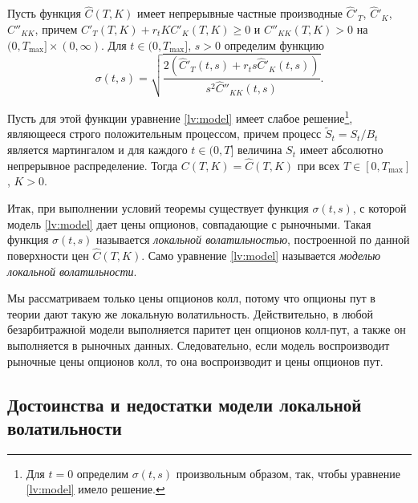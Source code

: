 \begin{theorem}
\label{lv:t:dupire}
Пусть функция $\hat C(T,K)$ имеет непрерывные частные производные $\hat C'_T$, $\hat C'_K$, $\hat C''_{KK}$, причем $C'_T(T,K) + r_t K C'_K(T,K)\ge 0$ и $C''_{KK}(T,K)>0$  на $(0,T_{\max}]\times(0,\infty)$.
Для $t\in(0,T_{\max}]$, $s>0$ определим функцию
\begin{equation}
\label{lv:dupire}
\sigma(t,s) = \sqrt{\frac{2(\hat C'_T(t,s) + r_ts\hat C'_K(t,s))}{s^2\hat C''_{KK}(t,s)}}.
\end{equation}

Пусть для этой функции уравнение \eqref{lv:model} имеет слабое решение\footnote{Для $t=0$ определим $\sigma(t,s)$ произвольным образом, так, чтобы уравнение \eqref{lv:model} имело решение.}, являющееся строго положительным процессом, причем процесс $\tilde S_t = S_t/B_t$ является мартингалом и для каждого $t\in(0,T]$ величина $S_t$ имеет абсолютно непрерывное распределение.
Тогда $C(T,K) = \hat C(T,K)$ при всех $T\in[0,T_{\max}]$, $K>0$.
\end{theorem}

Итак, при выполнении условий теоремы существует функция $\sigma(t,s)$, с которой модель \eqref{lv:model} дает цены опционов, совпадающие с рыночными.
Такая функция $\sigma(t,s)$ называется \emph{локальной волатильностью}, построенной по данной поверхности цен $\hat C(T,K)$.
Само уравнение \eqref{lv:model} называется \emph{моделью локальной волатильности}.

\begin{remark}
Мы рассматриваем только цены опционов колл, потому что опционы пут в теории дают такую же локальную волатильность.
Действительно, в любой безарбитражной модели выполняется паритет цен опционов колл-пут, а также он выполняется в рыночных данных.
Следовательно, если модель воспроизводит рыночные цены опционов колл, то она воспроизводит и цены опционов пут.
\end{remark}



\subsection{Достоинства и недостатки модели локальной волатильности}
\label{lv:s:discussion}

